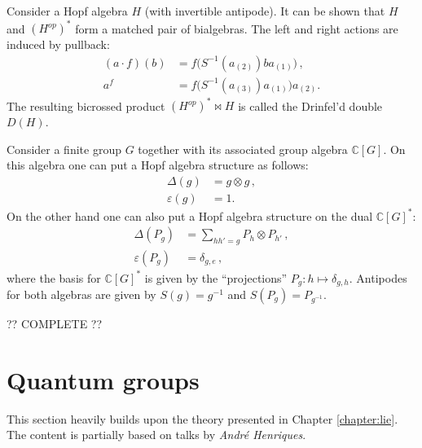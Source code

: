     \begin{construct}
        Consider a Hopf algebra $H$ (with invertible antipode). It can be shown that $H$ and $(H^{op})^*$ form a matched pair of bialgebras. The left and right actions are induced by pullback:
        \begin{align}
            (a\cdot f)(b) &= f\big(S^{-1}(a_{(2)})ba_{(1)}\big)\,,\\
            a^f &= f\big(S^{-1}(a_{(3)})a_{(1)}\big)a_{(2)}.
        \end{align}
        The resulting bicrossed product $(H^{op})^*\bowtie H$ is called the Drinfel'd double $D(H)$.
    \end{construct}
    \begin{example}
        Consider a finite group $G$ together with its associated group algebra $\mathbb{C}[G]$. On this algebra one can put a Hopf algebra structure as follows:
        \begin{align}
            \Delta(g) &= g\otimes g\,,\\
            \varepsilon(g) &= 1.
        \end{align}
        On the other hand one can also put a Hopf algebra structure on the dual $\mathbb{C}[G]^*$:
        \begin{align}
            \Delta(P_g) &= \sum_{hh'=g}P_h\otimes P_{h'}\,,\\
            \varepsilon(P_g) &= \delta_{g,e}\,,
        \end{align}
        where the basis for $\mathbb{C}[G]^*$ is given by the ``projections'' $P_g:h\mapsto\delta_{g,h}$. Antipodes for both algebras are given by $S(g)=g^{-1}$ and $S(P_g)=P_{g^{-1}}$.

        ?? COMPLETE ??
    \end{example}

\section{Quantum groups}

    This section heavily builds upon the theory presented in Chapter \ref{chapter:lie}. The content is partially based on talks by \textit{Andr\'e Henriques}.


